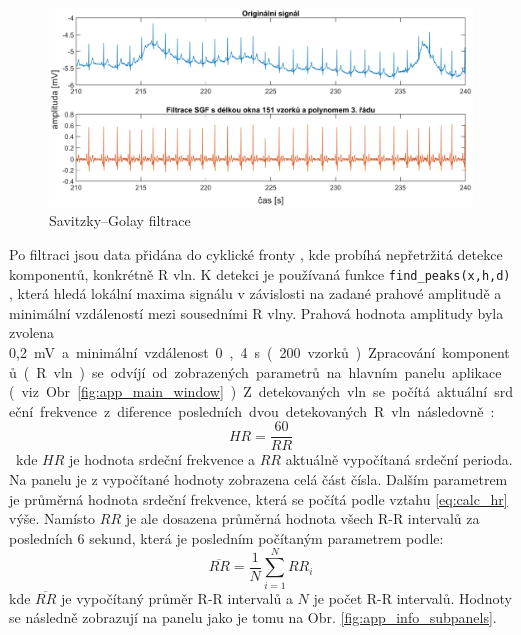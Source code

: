 \begin{figure}[h]
    \begin{center}
        \includegraphics[width=1\textwidth]{../assets/figures/sgf_filter}
        \caption{Savitzky–Golay filtrace}
        \label{fig:sgf_filter}
    \end{center}
\end{figure}

Po filtraci jsou data přidána do cyklické fronty \cite{circlebuffer}, kde
probíhá nepřetržitá detekce komponentů, konkrétně R vln. K detekci je používaná
funkce \texttt{find{\_}peaks(x,h,d)} \cite{scipyFindpeaks}, která hledá lokální
maxima signálu v závislosti na zadané prahové amplitudě a minimální vzdáleností
mezi sousedními R vlny. Prahová hodnota amplitudy byla zvolena 0,2~\si\mV~a
minimální vzdálenost 0,4~\si\s~ (200 vzorků). 

Zpracování komponentů (R vln) se odvíjí od zobrazených parametrů na hlavním
panelu aplikace (viz Obr. \ref{fig:app_main_window}). Z detekovaných vln se
počítá aktuální srdeční frekvence z diference posledních dvou detekovaných R vln
následovně:
\begin{equation}
    \label{eq:calc_hr}
    HR = \frac{60}{RR}
\end{equation}
kde $HR$ je hodnota srdeční frekvence a $RR$ aktuálně vypočítaná srdeční
perioda. Na panelu je z vypočítané hodnoty zobrazena celá část čísla. Dalším
parametrem je průměrná hodnota srdeční frekvence, která se počítá podle vztahu
\ref{eq:calc_hr} výše. Namísto $RR$ je ale dosazena průměrná hodnota všech R-R
intervalů za posledních 6 sekund, která je posledním počítaným parametrem podle:
\begin{equation}
    \overline{RR} = \frac{1}{N} \sum_{i=1}^N RR_i
\end{equation}
kde $\overline{RR}$ je vypočítaný průměr R-R intervalů a $N$ je počet R-R
intervalů. Hodnoty se následně zobrazují na panelu jako je tomu na Obr.
\ref{fig:app_info_subpanels}. 

